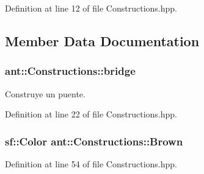 Definition at line 12 of file Constructions.\+hpp.



\subsection{Member Data Documentation}
\hypertarget{classant_1_1_constructions_a6eee22549eb50890813b3103814b2f8f}{
\subsubsection[{bridge}]{ ant\+::\+Constructions\+::bridge\hspace{0.3cm}{\ttfamily [static]}}}\label{classant_1_1_constructions_a6eee22549eb50890813b3103814b2f8f}


Construye un puente. 



Definition at line 22 of file Constructions.\+hpp.

\hypertarget{classant_1_1_constructions_a6b4b56037615b211e944a4dc6533aeb1}{
\subsubsection[{Brown}]{\setlength{\rightskip}{0pt plus 5cm}sf\+::\+Color ant\+::\+Constructions\+::\+Brown\hspace{0.3cm}{\ttfamily [static]}}}\label{classant_1_1_constructions_a6b4b56037615b211e944a4dc6533aeb1}


Definition at line 54 of file Constructions.\+hpp.

